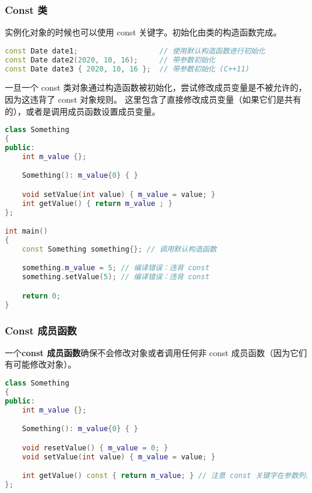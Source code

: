 \documentclass[../../LearnCpp.tex]{subfiles}
\begin{document}

\subsubsection*{Const 类}

实例化对象的时候也可以使用 const 关键字。初始化由类的构造函数完成。

\begin{lstlisting}[language=C++]
const Date date1;                   // 使用默认构造函数进行初始化
const Date date2(2020, 10, 16);     // 带参数初始化
const Date date3 { 2020, 10, 16 };  // 带参数初始化 (C++11)
\end{lstlisting}

一旦一个 const 类对象通过构造函数被初始化，尝试修改成员变量是不被允许的，因为这违背了 const 对象规则。
这里包含了直接修改成员变量（如果它们是共有的），或者是调用成员函数设置成员变量。

\begin{lstlisting}[language=C++]
class Something
{
public:
    int m_value {};

    Something(): m_value{0} { }

    void setValue(int value) { m_value = value; }
    int getValue() { return m_value ; }
};

int main()
{
    const Something something{}; // 调用默认构造函数

    something.m_value = 5; // 编译错误：违背 const
    something.setValue(5); // 编译错误：违背 const

    return 0;
}
\end{lstlisting}

\subsubsection*{Const 成员函数}

一个\textbf{const 成员函数}确保不会修改对象或者调用任何非 const 成员函数（因为它们有可能修改对象）。

\begin{lstlisting}[language=C++]
class Something
{
public:
    int m_value {};

    Something(): m_value{0} { }

    void resetValue() { m_value = 0; }
    void setValue(int value) { m_value = value; }

    int getValue() const { return m_value; } // 注意 const 关键字在参数列表后，函数体前
};
\end{lstlisting}
\end{document}
